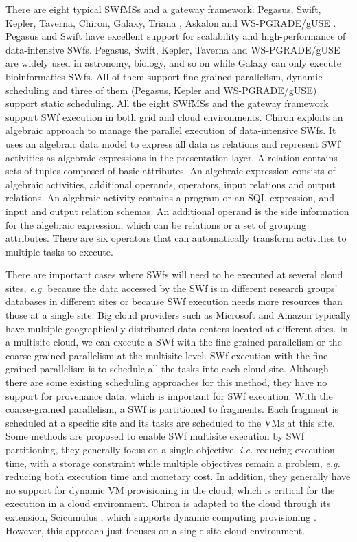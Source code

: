 There are eight typical SWfMSs and a gateway framework: Pegasus,
Swift, Kepler, Taverna, Chiron, Galaxy, Triana \cite{Taylor2007}, Askalon \cite{Fahringer2007} and WS-PGRADE/gUSE \cite{Kacsuk2012}. 
Pegasus and Swift have excellent support for scalability and high-performance of data-intensive SWfs.
Pegasus, Swift, Kepler, Taverna and WS-PGRADE/gUSE are widely used in astronomy, biology, and so on while Galaxy can only execute bioinformatics SWfs.
All of them support fine-grained parallelism, dynamic scheduling and three of them (Pegasus, Kepler and WS-PGRADE/gUSE) support static scheduling. All the eight SWfMSs and the gateway framework support SWf execution in both grid and cloud environments.
Chiron exploits an algebraic approach \cite{Ozsu2011} to manage the parallel execution of data-intensive SWfs. It uses an algebraic data model to express all data as relations and represent SWf activities as algebraic expressions in the presentation layer. 
A relation contains sets of tuples composed of basic attributes.
An algebraic expression consists of algebraic
activities, additional operands, operators, input relations and output relations.
An algebraic activity contains a program or an SQL expression, and input
and output relation schemas. 
An additional operand is the side information for the algebraic expression, which can be relations or a set of grouping attributes.
There are six operators that can automatically transform activities to multiple tasks to execute.

There are important cases where SWfs will need to be executed at several cloud sites, \textit{e.g.} because the data accessed by the SWf is in different research groups' databases in different sites or because SWf execution needs more resources than those at a single site. Big cloud providers such as Microsoft and Amazon typically have multiple geographically distributed data centers located at different sites. 
In a multisite cloud, we can execute a SWf with the fine-grained parallelism or the coarse-grained parallelism at the multisite level.
SWf execution with the fine-grained parallelism is to schedule all the tasks into each cloud site. 
Although there are some existing scheduling approaches \cite{Duan2014,Ostermann2009a} for this method, they have no support for provenance data, which is important for SWf execution.
With the coarse-grained parallelism, a SWf is partitioned to fragments. Each fragment is scheduled at a specific site and its tasks are scheduled to the VMs at this site. 
Some methods \cite{Chen2012a, Chen2013} are proposed to enable SWf multisite execution by SWf partitioning, they generally focus on a single objective, \textit{i.e.} reducing execution time, with a storage constraint while multiple objectives remain a problem, \textit{e.g.} reducing both execution time and monetary cost. In addition, they generally have no support for dynamic VM provisioning in the cloud, which is critical for the execution in a cloud environment. 
Chiron is adapted to the cloud through its extension, Scicumulus \cite{Oliveira2010,Oliveira2012}, which supports dynamic computing provisioning \cite{Oliveira2012a}. However, this approach just focuses on a single-site cloud environment.


